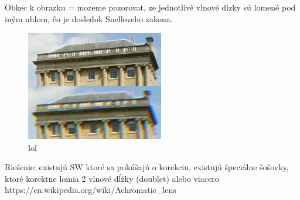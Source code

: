 Obkec k obrazku = mozeme pozorovat, ze jednotlivé vlnové dlzky sú lomené pod iným uhlom, čo je
dosledok Snelloveho zakona.
\begin{figure}[h]
\centering
\label{chromaticAexample}
\includegraphics[width=6cm]{obrazky-figures/chromaticAberrationWikipedia.jpg}
\caption{lol}
\end{figure}

Riešenie: existujú SW \cite{automaticRemovalCA} ktoré sa pokúšajú o korekciu, 
existujú špeciálne šošovky, ktoré korektne lomia 2 vlnové dĺžky (doublet) alebo viacero
https://en.wikipedia.org/wiki/Achromatic\_lens
